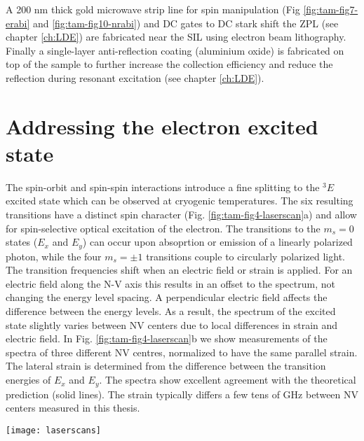 A 200 nm thick gold microwave strip line for spin manipulation (Fig \ref{fig:tam-fig7-erabi} and \ref{fig:tam-fig10-nrabi}) and DC gates to DC stark shift the ZPL (see chapter \ref{ch:LDE}) are  fabricated near the SIL using electron beam lithography. Finally a single-layer anti-reflection coating\cite{Yeung__2012} (aluminium oxide) is fabricated on top of the sample to further increase the collection efficiency and reduce the reflection during resonant excitation (see chapter \ref{ch:LDE}).

\section{Addressing the electron excited state}
\label{sec:opticalcontrol}

The spin-orbit and spin-spin interactions introduce a fine splitting to the $^3E$ excited state which can be observed at cryogenic temperatures. The six resulting transitions have a distinct spin character (Fig. \ref{fig:tam-fig4-laserscan}a) and allow for spin-selective optical excitation of the electron. The transitions to the $m_s = 0$ states ($E_x$ and $E_y$) can occur upon absoprtion or emission of a linearly polarized photon, while the four $m_s = \pm 1$ transitions couple to circularly polarized light. The transition frequencies shift when an electric field or strain is applied. For an electric field along the N-V axis this results in an offset to the spectrum, not changing the energy level spacing. A perpendicular electric field affects the difference between the energy levels. As a result, the spectrum of the excited state slightly varies between NV centers due to local differences in strain and electric field. In Fig. \ref{fig:tam-fig4-laserscan}b we show measurements of the spectra of three different NV centres, normalized to have the same parallel strain. The lateral strain is determined from the difference between the transition energies of $E_x$ and $E_y$. The spectra show excellent agreement with the theoretical prediction (solid lines). The strain typically differs a few tens of GHz between NV centers measured in this thesis.

\begin{figure*}
	\centering
	\texttt{[image: laserscans]}
	\caption{\label{fig:tam-fig4-laserscan} \textbf{Spectrum of the excited state} (a) Energy level diagram of the fine structure of the excited states. There are two levels with spin $m_s = 0$ ($E_x$,$E_y$) and four $m_s = \pm 1$ levels ($A_1$,$A_2$,$E_1$ and $E_2$). At finite strain the degeneracies between $E_x$,$E_y$ and $E_1$,$E_2$ are lifted. (b) The energy spectrum for three different NV centers is measured by varying the frequency of the excitation laser and detecting the fluorescence in the PSB. The observed transitions $E_1$ (blue), $E_2$ (red) For each scan the transition energies $\Delta E_x$ and $\Delta E_y$ are determined to calculate the lateral ($\frac{\Delta E_y-\Delta E_x}{2}$) and parrallel ($\frac{\Delta E_y+\Delta E_x}{2}$) strain. The parrallel strain is then substracted for each scan. Laser frequency is with respect to 470.4 THz.}
\end{figure*}

